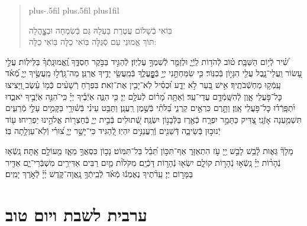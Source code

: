 \documentclass[twoside, openany, parskip=half, 11pt]{book}
\begin{document}
\begin{quote}
\leftskip=0pt plus-.5fil
\rightskip=0pt plus.5fil
\parfillskip=0pt plus1fil

בּֽוֹאִי בְֿשָׁלוֹם עֲטֶרֶת בַּעְלָהּ \hfill
גַּם בְּֿשִׂמְחָה וּבְצׇׇׇׇָהֳלָה \\
תּוֹךְ אֱמוּנֵי עַם סְֿגֻּלָּה \hfill
בּֽוֹאִי כַלָּה בּֽוֹאִי כַלָּה:

\lechadodi

\end{quote}


שִׁ֝֗יר לְֿי֥וֹם הַשַּׁבָּֽת׃
ט֗וֹב לְֿהֹד֥וֹת לַֽיְֿיָ֑ וּלְזַמֵּ֖ר לְֿשִׁמְךָ֣ עֶלְיֽוֹן׃
לְֿהַגִּ֣יד בַּבֹּ֣קֶר חַסְדֶּ֑ךָ וֶֽ֝אֱמוּנָֽתְֿךָ֗ בַּלֵּילֽוֹת׃
עֲלֵ֣י עָ֭שׂוֹר וַֽעֲלֵי־נָ֑בֶל עֲלֵ֖י הִגָּי֣וֹן בְּֿכִנּֽוֹר׃
כִּ֤י שִׂמַּחְתַּ֣נִי יְיָ֣ בְּֿפׇׇׇׇׇׇׇָֽעֳלֶ֑ךָ בְּֿמַֽעֲשֵׂ֖י יָדֶ֣יךָ אֲרַנֵּֽן׃
מַה־גָּֽדְֿל֣וּ מַֽעֲשֶׂ֣יךָ יְיָ֑ מְֿ֝אֹ֗ד עָֽמְֿק֥וּ מַחְשְֿׁבֹתֶֽיךָ׃
אִ֣ישׁ בַּ֭עַר לֹ֣א יֵדָ֑ע וּ֝כְסִ֗יל לֹֽא־יָבִ֥ין אֶת־זֹֽאת׃
בִּפְרֹ֤חַ רְֿשָׁעִ֨ים כְּֿמ֥וֹ עֵ֗שֶׂב וַ֭יָּצִיצוּ כׇּל־פֹּ֣עֲלֵי אָ֑וֶן לְֿהִשָּֽׁמְֿדָ֥ם עֲדֵי־עַֽד׃
וְֿאַתָּ֥ה מָ֝ר֗וֹם לְֿעֹלָ֥ם יְיָ׃
כִּ֤י הִנֵּ֢ה אֹֽיְֿבֶ֡יךָ יְיָ֗ כִּֽי־ֹהִנֵּ֣ה אֹֽיְֿבֶ֣יךָ יֹאבֵ֑דוּ יִ֝תְפָּֽרְֿד֗וּ כׇּל־פֹּ֥עֲלֵי אָֽוֶן׃
וַתָּ֣רֶם כִּרְאֵ֣ים קַרְנִ֑י בַּ֝לֹּתִ֗י בְּֿשֶׁ֣מֶן רַֽעֲנָֽן׃
וַתַּבֵּ֥ט עֵינִ֗י בְּֿשׁ֫וּרָ֥י בַּקָּמִ֣ים עָלַ֣י מְֿרֵעִ֑ים תִּשְׁמַ֥עְנָה אָזְֿנָֽי׃
 צַ֭דִּיק כַּתָּמָ֣ר יִפְרָ֑ח כְּֿאֶ֖רֶז בַּלְּֿבָנ֣וֹן יִשְׂגֶּֽה׃
שְֿׁ֭תוּלִים בְּֿבֵ֣ית יְיָ֑ בְּֿחַצְר֖וֹת אֱלֹהֵ֣ינוּ יַפְרִֽיחוּ׃
ע֖וֹד יְֿנוּב֣וּן בְּֿשֵׂיבָ֑ה דְּֿשֵׁנִ֖ים וְֿרַֽעֲנַנִּ֣ים יִהְיֽוּ׃
לְֿ֭הַגִּיד כִּי־יָשָׁ֣ר יְיָ֑ צ֝וּרִ֗י וְֿלֹֽא־עַוְלָ֥תָה בּֽוֹ׃

\clearpage
{}
מָלָךְ֘ גֵּא֢וּת לָ֫בֵ֥שׁ לָבֵ֣שׁ יְ֖יָ עֹ֣ז הִתְאַזָּר֑ אַף־תִּכּ֣וֹן תֵּ֝בֵ֗ל בַּל־תִּמּֽוֹט׃
נָכ֣וֹן כִּסְאֲךָ֣ מֵאָ֑ז מֵ֖עוֹלָ֣ם אָֽתָּה׃
נָֽשְֿׂא֤וּ נְֿהָר֨וֹת יְיָ֗ נָֽשְֿׂא֣וּ נְֿהָר֣וֹת קוֹלָ֑ם יִשְׂא֖וּ נְֿהָר֣וֹת דָּכְֿיָֽם׃
 מִקֹּלוֹ֨ת מַ֤יִם רַבִּים אַדִּירִ֥ים מִשְׁבְּֿרֵי־יָ֑ם אַדִּ֖יר בַּמָּר֣וֹם יְיָ׃
עֵֽדֹ֨תֶיךָ נֶאֶמְנ֬וּ מְֿאֹ֗ד לְֿבֵֽיתְֿךָ֥ נָֽאֲוָה־קֹּ֑דֶשׁ יְ֜יָ֗ לְֿאֹ֣רֶךְ יָמִֽים׃

\mournerskaddish

\vspace{\baselineskip}

{\let\clearpage\relax
\chapter[ערבית לשבת ויום טוב]{ ערבית לשבת ויום טוב }}

\barachu
\end{document}
